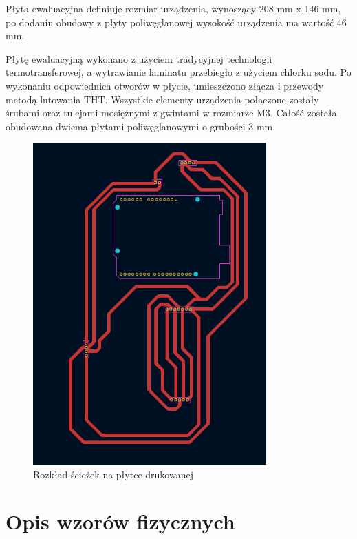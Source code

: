\vspace{12pt}

Płyta ewaluacyjna definiuje rozmiar urządzenia, wynoszący 208 mm x 146 mm,
po dodaniu obudowy z płyty poliwęglanowej wysokość urządzenia ma wartość 46 mm.

\vspace{12pt}

Płytę ewaluacyjną wykonano z użyciem tradycyjnej technologii termotransferowej, a wytrawianie laminatu przebiegło z użyciem chlorku sodu. Po wykonaniu odpowiednich otworów w płycie, umieszczono złącza i przewody metodą lutowania THT.                                Wszystkie elementy urządzenia połączone zostały śrubami oraz tulejami mosiężnymi z gwintami w rozmiarze M3. Całość została obudowana dwiema płytami poliwęglanowymi                   o grubości 3 mm.

\begin{figure}[h!]
    \centering
    \includegraphics[width=0.8\textwidth]{images/layout.png}
    \caption{Rozkład ścieżek na płytce drukowanej}
    \label{fig:twoj_obrazek}
\end{figure}

\chapter{Opis wzorów fizycznych}

